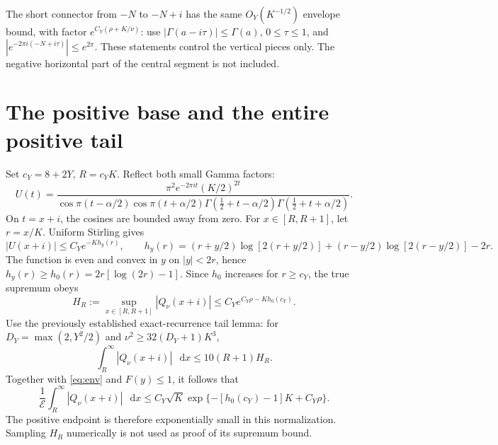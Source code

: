 \documentclass[11pt,a4paper]{article}
\newcommand{\dd}{\mathop{}\!\mathrm d}
\newcommand{\E}{\mathcal E}
\begin{document}
The short connector from \(-N\) to \(-N+i\) has the same
\(O_Y(K^{-1/2})\) envelope bound, with factor
\(e^{C_Y(\rho+K/\nu)}\): use
\(|\Gamma(a-i\tau)|\le\Gamma(a)\), \(0\le\tau\le1\),
and \(|e^{-2\pi i(-N+i\tau)}|\le e^{2\pi}\).
These statements control the vertical pieces only. The negative
horizontal part of the central segment is not included.

\section{The positive base and the entire positive tail}
Set \(c_Y=8+2Y\), \(R=c_YK\). Reflect both small Gamma factors:
\[
 U(t)=\frac{\pi^2e^{-2\pi it}(K/2)^{2t}}
 {\cos\pi(t-\alpha/2)\cos\pi(t+\alpha/2)
 \Gamma(\tfrac12+t-\alpha/2)\Gamma(\tfrac12+t+\alpha/2)}.
\]
On \(t=x+i\), the cosines are bounded away from zero.
For \(x\in[R,R+1]\), let \(r=x/K\). Uniform Stirling gives
\[
 |U(x+i)|\le C_Ye^{-Kh_y(r)},\qquad
 h_y(r)=(r+y/2)\log[2(r+y/2)]
 +(r-y/2)\log[2(r-y/2)]-2r.
\]
The function is even and convex in \(y\) on \(|y|<2r\), hence
\(h_y(r)\ge h_0(r)=2r[\log(2r)-1]\).
Since \(h_0\) increases for \(r\ge c_Y\), the true supremum obeys
\[
 H_R:=\sup_{x\in[R,R+1]}|Q_\nu(x+i)|
 \le C_Ye^{C_Y\rho-Kh_0(c_Y)}.
\]
Use the previously established exact-recurrence tail lemma:
for \(D_Y=\max(2,Y^2/2)\) and
\(\nu^2\ge32(D_Y+1)K^3\),
\[
 \int_R^\infty|Q_\nu(x+i)|\,\dd x\le10(R+1)H_R.
\]
Together with \eqref{eq:env} and \(F(y)\le1\), it follows that
\begin{equation}\label{eq:positive}
 \frac1{\E}\int_R^\infty|Q_\nu(x+i)|\,\dd x
 \le C_Y\sqrt K\exp\{-[h_0(c_Y)-1]K+C_Y\rho\}.
\end{equation}
The positive endpoint is therefore exponentially small in this
normalization. Sampling \(H_R\) numerically is not used as proof
of its supremum bound.
\end{document}
